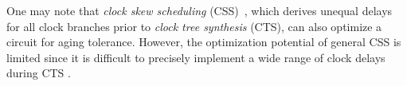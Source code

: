 
One may note that \textit{clock skew scheduling} (CSS)~\cite{fishburn1990clock}, which derives unequal delays for all clock branches prior to \textit{clock tree synthesis} (CTS), can also optimize a circuit for aging tolerance. However, the optimization potential of general CSS is limited since it is difficult to precisely implement a wide range of clock delays during CTS \cite{li2011optimal}. %



